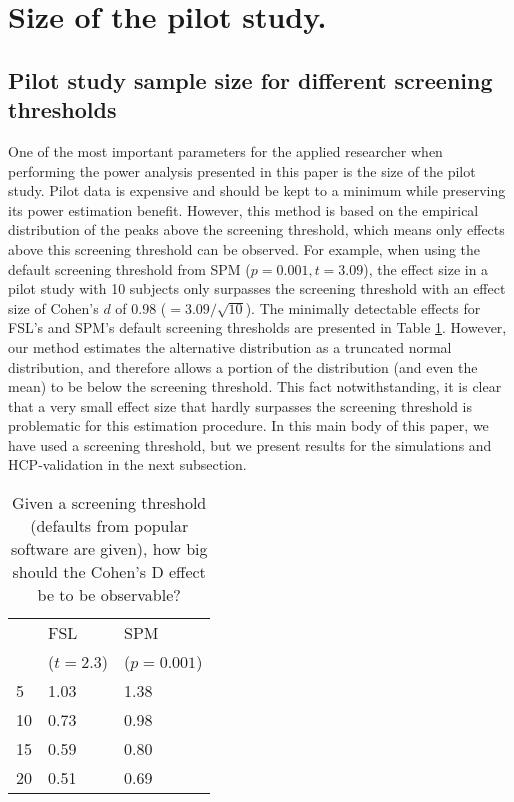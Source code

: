 \section{Size of the pilot study.\label{app_ss10}}

\subsection{Pilot study sample size for different screening thresholds}

One of the most important parameters for the applied researcher when performing the power analysis presented in this paper is the size of the pilot study.  Pilot data is expensive and should be kept to a minimum while preserving its power estimation benefit.  However, this method is based on the empirical distribution of the peaks above the screening threshold, which means only effects above this screening threshold can be observed.  For example, when using the default screening threshold from SPM ($p=0.001, t=3.09$),  the effect size in a pilot study with 10 subjects only surpasses the screening threshold with an effect size of Cohen's $d$ of 0.98 ($=3.09/\sqrt{10}$).
The minimally detectable effects for FSL's and SPM's default screening thresholds are presented in Table \ref{mindeteff}.  However, our method estimates the alternative distribution as a truncated normal distribution, and therefore allows a portion of the distribution (and even the mean) to be below the screening threshold.  This fact notwithstanding, it is clear that a very small effect size that hardly surpasses the screening threshold is problematic for this estimation procedure.  In this main body of this paper, we have used a screening threshold, but we present results for the simulations and HCP-validation in the next subsection.

\begin{table}
\begin{center}
\begin{tabular}{lll}
\toprule
& FSL & SPM \\
& ($t=2.3$) & ($p=0.001$) \\
\midrule
5 & 1.03 & 1.38\\
10 & 0.73 & 0.98\\
15 & 0.59 & 0.80\\
20 & 0.51 & 0.69\\
\bottomrule
\end{tabular}
\end{center}
\caption{Given a screening threshold (defaults from popular software are given), how big should the Cohen's D effect be to be observable? \label{mindeteff}}
\end{table}


